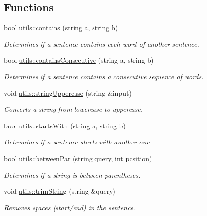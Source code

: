 \subsection*{Functions}
\begin{DoxyCompactItemize}
\item 
bool \hyperlink{namespaceutils_aaaff51c00798a6c05a15f4ecd0f02e9e}{utils\+::contains} (string a, string b)
\begin{DoxyCompactList}\small\item\em Determines if a sentence contains each word of another sentence. \end{DoxyCompactList}\item 
bool \hyperlink{namespaceutils_af9af9e01b679f955003203f29ddf130b}{utils\+::contains\+Consecutive} (string a, string b)
\begin{DoxyCompactList}\small\item\em Determines if a sentence contains a consecutive sequence of words. \end{DoxyCompactList}\item 
void \hyperlink{namespaceutils_a4cc31521e740c9e31b4bfa8ee85eff46}{utils\+::string\+Uppercase} (string \&input)
\begin{DoxyCompactList}\small\item\em Converts a string from lowercase to uppercase. \end{DoxyCompactList}\item 
bool \hyperlink{namespaceutils_ae840ea1b4ad4ce23c2b48158ac75d557}{utils\+::starts\+With} (string a, string b)
\begin{DoxyCompactList}\small\item\em Determines if a sentence starts with another one. \end{DoxyCompactList}\item 
bool \hyperlink{namespaceutils_a1e1de2e5772bffdfe2c8d3309a61ddab}{utils\+::between\+Par} (string query, int position)
\begin{DoxyCompactList}\small\item\em Determines if a string is between parentheses. \end{DoxyCompactList}\item 
void \hyperlink{namespaceutils_a9f184d101ac739ab058355ab5413ca9a}{utils\+::trim\+String} (string \&query)
\begin{DoxyCompactList}\small\item\em Removes spaces (start/end) in the sentence. \end{DoxyCompactList}\item 

\end{DoxyCompactItemize}
